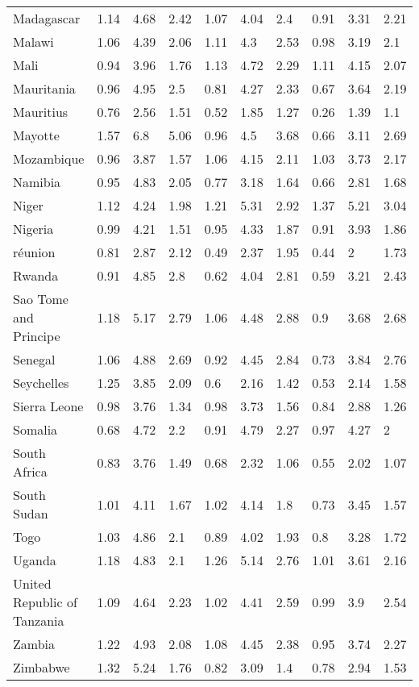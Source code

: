 \begin{longtable}[t]{llllllllll}
\addlinespace
Madagascar & 1.14 & 4.68 & 2.42 & 1.07 & 4.04 & 2.4 & 0.91 & 3.31 & 2.21\\
Malawi & 1.06 & 4.39 & 2.06 & 1.11 & 4.3 & 2.53 & 0.98 & 3.19 & 2.1\\
Mali & 0.94 & 3.96 & 1.76 & 1.13 & 4.72 & 2.29 & 1.11 & 4.15 & 2.07\\
Mauritania & 0.96 & 4.95 & 2.5 & 0.81 & 4.27 & 2.33 & 0.67 & 3.64 & 2.19\\
Mauritius & 0.76 & 2.56 & 1.51 & 0.52 & 1.85 & 1.27 & 0.26 & 1.39 & 1.1\\
\addlinespace
Mayotte & 1.57 & 6.8 & 5.06 & 0.96 & 4.5 & 3.68 & 0.66 & 3.11 & 2.69\\
Mozambique & 0.96 & 3.87 & 1.57 & 1.06 & 4.15 & 2.11 & 1.03 & 3.73 & 2.17\\
Namibia & 0.95 & 4.83 & 2.05 & 0.77 & 3.18 & 1.64 & 0.66 & 2.81 & 1.68\\
Niger & 1.12 & 4.24 & 1.98 & 1.21 & 5.31 & 2.92 & 1.37 & 5.21 & 3.04\\
Nigeria & 0.99 & 4.21 & 1.51 & 0.95 & 4.33 & 1.87 & 0.91 & 3.93 & 1.86\\
\addlinespace
réunion & 0.81 & 2.87 & 2.12 & 0.49 & 2.37 & 1.95 & 0.44 & 2 & 1.73\\
Rwanda & 0.91 & 4.85 & 2.8 & 0.62 & 4.04 & 2.81 & 0.59 & 3.21 & 2.43\\
Sao Tome and Principe & 1.18 & 5.17 & 2.79 & 1.06 & 4.48 & 2.88 & 0.9 & 3.68 & 2.68\\
Senegal & 1.06 & 4.88 & 2.69 & 0.92 & 4.45 & 2.84 & 0.73 & 3.84 & 2.76\\
Seychelles & 1.25 & 3.85 & 2.09 & 0.6 & 2.16 & 1.42 & 0.53 & 2.14 & 1.58\\
\addlinespace
Sierra Leone & 0.98 & 3.76 & 1.34 & 0.98 & 3.73 & 1.56 & 0.84 & 2.88 & 1.26\\
Somalia & 0.68 & 4.72 & 2.2 & 0.91 & 4.79 & 2.27 & 0.97 & 4.27 & 2\\
South Africa & 0.83 & 3.76 & 1.49 & 0.68 & 2.32 & 1.06 & 0.55 & 2.02 & 1.07\\
South Sudan & 1.01 & 4.11 & 1.67 & 1.02 & 4.14 & 1.8 & 0.73 & 3.45 & 1.57\\
Togo & 1.03 & 4.86 & 2.1 & 0.89 & 4.02 & 1.93 & 0.8 & 3.28 & 1.72\\
\addlinespace
Uganda & 1.18 & 4.83 & 2.1 & 1.26 & 5.14 & 2.76 & 1.01 & 3.61 & 2.16\\
United Republic of Tanzania & 1.09 & 4.64 & 2.23 & 1.02 & 4.41 & 2.59 & 0.99 & 3.9 & 2.54\\
Zambia & 1.22 & 4.93 & 2.08 & 1.08 & 4.45 & 2.38 & 0.95 & 3.74 & 2.27\\
Zimbabwe & 1.32 & 5.24 & 1.76 & 0.82 & 3.09 & 1.4 & 0.78 & 2.94 & 1.53\\*
\end{longtable}
\endgroup{}
